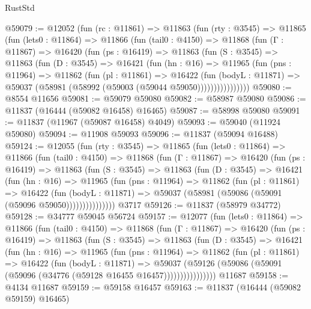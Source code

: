 \begin{lexlean}{RustStd}
\begin{coremodule}
@59079 := @12052
    (fun (rc : @11861) =>
    @11863
      (fun (rty : @3545) =>
      @11865
        (fun (lets0 : @11864) =>
        @11866
          (fun (tail0 : @4150) =>
          @11868
            (fun (Γ : @11867) =>
            @16420
              (fun (ps : @16419) =>
              @11863
                (fun (S : @3545) =>
                @11863
                  (fun (D : @3545) =>
                  @16421
                    (fun (hn : @16) =>
                    @11965
                      (fun (pns : @11964) =>
                      @11862
                        (fun (pl : @11861) =>
                        @16422
                          (fun (bodyL : @11871) =>
                          @59037 (@58981 (@58992 (@59003 (@59044 @59050))))))))))))))))
@59080 := @8554 @11656
@59081 := @59079 @59080
@59082 := @58987 @59080
@59086 := @11837 (@16444 (@59082 @16458) @16465)
@59087 := @58998 @59080
@59091 := @11837 (@11967 (@59087 @16458) @4049)
@59093 := @59040 (@11924 @59080)
@59094 := @11908 @59093
@59096 := @11837 (@59094 @16488)
@59124 := @12055
    (fun (rty : @3545) =>
    @11865
      (fun (lets0 : @11864) =>
      @11866
        (fun (tail0 : @4150) =>
        @11868
          (fun (Γ : @11867) =>
          @16420
            (fun (ps : @16419) =>
            @11863
              (fun (S : @3545) =>
              @11863
                (fun (D : @3545) =>
                @16421
                  (fun (hn : @16) =>
                  @11965
                    (fun (pns : @11964) =>
                    @11862
                      (fun (pl : @11861) =>
                      @16422
                        (fun (bodyL : @11871) =>
                        @59037 (@58981 (@59086 (@59091 (@59096 @59050)))))))))))))))
    @3717
@59126 := @11837 (@58979 @34772)
@59128 := @34777 @59045 @56724
@59157 := @12077
    (fun (lets0 : @11864) =>
    @11866
      (fun (tail0 : @4150) =>
      @11868
        (fun (Γ : @11867) =>
        @16420
          (fun (ps : @16419) =>
          @11863
            (fun (S : @3545) =>
            @11863
              (fun (D : @3545) =>
              @16421
                (fun (hn : @16) =>
                @11965
                  (fun (pns : @11964) =>
                  @11862
                    (fun (pl : @11861) =>
                    @16422
                      (fun (bodyL : @11871) =>
                      @59037
                        (@59126
                          (@59086 (@59091 (@59096 (@34776 (@59128 @16455 @16457))))))))))))))))
    @11687
@59158 := @4134 @11687
@59159 := @59158 @16457
@59163 := @11837 (@16444 (@59082 @59159) @16465)

\end{coremodule}
\end{lexlean}
